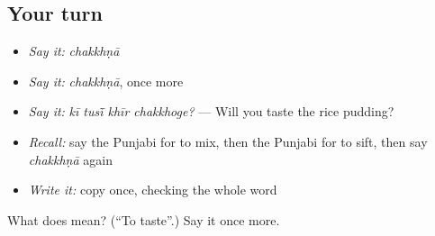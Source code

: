 \subsection*{Your turn}
\begin{itemize}
\raggedright
  \item \emph{Say it:} \emph{chakkhṇā}
  \item \emph{Say it:} \emph{chakkhṇā}, once more
  \item \emph{Say it:} \emph{kī tusī̃ khīr chakkhoge?} — Will you taste the rice pudding?
  \item \emph{Recall:} say the Punjabi for to mix, then the Punjabi for to sift, then say \emph{chakkhṇā} again
  \item \emph{Write it:} copy \textbf{} once, checking the whole word
\end{itemize}

\begin{tcolorbox}[breakable,colback=teal!4,colframe=teal!35!black,title={Before you move on}]
What does  mean? (\textquotedblleft{}To taste\textquotedblright{}.) Say it once more.
\end{tcolorbox}
